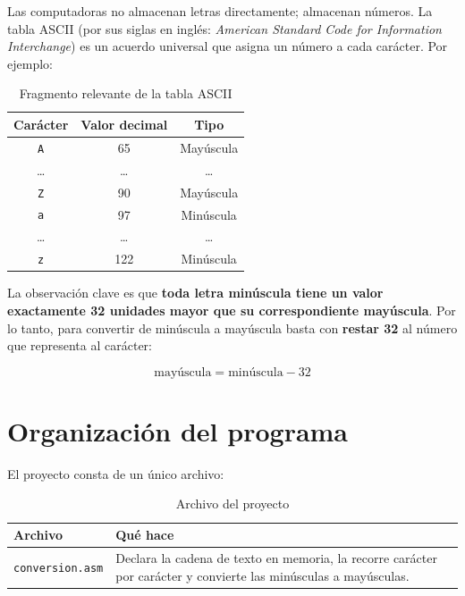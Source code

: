 \documentclass[12pt, letterpaper]{article}
\begin{document}
Las computadoras no almacenan letras directamente; almacenan números. La tabla ASCII (por sus siglas en inglés: \textit{American Standard Code for Information Interchange}) es un acuerdo universal que asigna un número a cada carácter. Por ejemplo:

\begin{table}[H]
    \centering
    \begin{tabular}{@{}ccc@{}}
        \toprule
        \textbf{Carácter} & \textbf{Valor decimal} & \textbf{Tipo} \\
        \midrule
        \texttt{A} & 65  & Mayúscula \\
        \ldots      & \ldots & \ldots \\
        \texttt{Z} & 90  & Mayúscula \\
        \midrule
        \texttt{a} & 97  & Minúscula \\
        \ldots      & \ldots & \ldots \\
        \texttt{z} & 122 & Minúscula \\
        \bottomrule
    \end{tabular}
    \caption{Fragmento relevante de la tabla ASCII}
\end{table}

La observación clave es que \textbf{toda letra minúscula tiene un valor exactamente 32 unidades mayor que su correspondiente mayúscula}. Por lo tanto, para convertir de minúscula a mayúscula basta con \textbf{restar 32} al número que representa al carácter:

\begin{equation}
    \text{mayúscula} = \text{minúscula} - 32
\end{equation}

\section{Organización del programa}

El proyecto consta de un único archivo:

\begin{table}[H]
    \centering
    \begin{tabular}{@{}lp{9cm}@{}}
        \toprule
        \textbf{Archivo} & \textbf{Qué hace} \\
        \midrule
        \texttt{conversion.asm} & Declara la cadena de texto en memoria, la recorre carácter por carácter y convierte las minúsculas a mayúsculas. \\
        \bottomrule
    \end{tabular}
    \caption{Archivo del proyecto}
\end{table}
\end{document}
